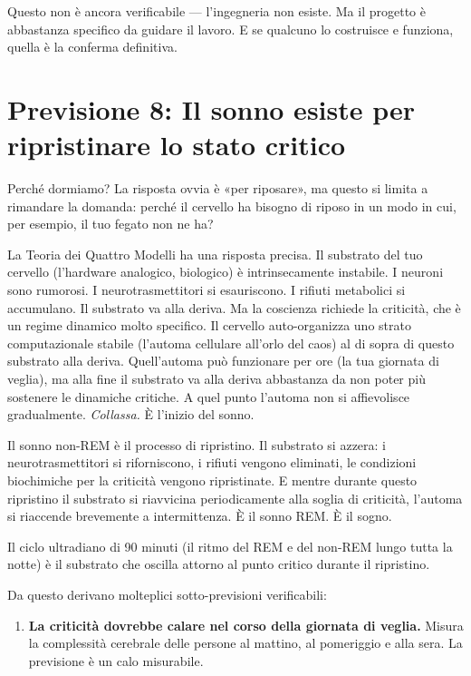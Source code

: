 \documentclass[11pt, twoside, openright]{book}
\begin{document}
Questo non è ancora verificabile --- l'ingegneria non esiste. Ma il progetto è abbastanza specifico da guidare il lavoro. E se qualcuno lo costruisce e funziona, quella è la conferma definitiva.

\section*{Previsione 8: Il sonno esiste per ripristinare lo stato critico}

Perché dormiamo? La risposta ovvia è «per riposare», ma questo si limita a rimandare la domanda: perché il cervello ha bisogno di riposo in un modo in cui, per esempio, il tuo fegato non ne ha?

La Teoria dei Quattro Modelli ha una risposta precisa. Il substrato del tuo cervello (l'hardware analogico, biologico) è intrinsecamente instabile. I neuroni sono rumorosi. I neurotrasmettitori si esauriscono. I rifiuti metabolici si accumulano. Il substrato va alla deriva. Ma la coscienza richiede la criticità, che è un regime dinamico molto specifico. Il cervello auto-organizza uno strato computazionale stabile (l'automa cellulare all'orlo del caos) al di sopra di questo substrato alla deriva. Quell'automa può funzionare per ore (la tua giornata di veglia), ma alla fine il substrato va alla deriva abbastanza da non poter più sostenere le dinamiche critiche. A quel punto l'automa non si affievolisce gradualmente. \textit{Collassa.} È l'inizio del sonno.

Il sonno non-REM è il processo di ripristino. Il substrato si azzera: i neurotrasmettitori si riforniscono, i rifiuti vengono eliminati, le condizioni biochimiche per la criticità vengono ripristinate. E mentre durante questo ripristino il substrato si riavvicina periodicamente alla soglia di criticità, l'automa si riaccende brevemente a intermittenza. È il sonno REM. È il sogno.

Il ciclo ultradiano di 90 minuti (il ritmo del REM e del non-REM lungo tutta la notte) è il substrato che oscilla attorno al punto critico durante il ripristino.

Da questo derivano molteplici sotto-previsioni verificabili:

\begin{enumerate}
  \item \textbf{La criticità dovrebbe calare nel corso della giornata di veglia.} Misura la complessità cerebrale delle persone al mattino, al pomeriggio e alla sera. La previsione è un calo misurabile.
\end{enumerate}
\end{document}
